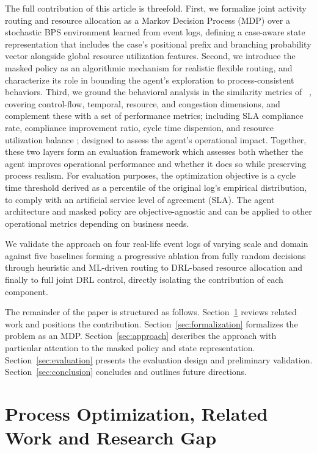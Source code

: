 \documentclass[runningheads]{llncs}
\begin{document}
The full contribution of this article is threefold. First, we formalize joint activity routing and resource allocation as a Markov Decision Process (MDP) over a stochastic BPS environment learned from event logs, defining a case-aware state representation that includes the case's positional prefix and branching probability vector alongside global resource utilization features. Second, we introduce the masked policy as an algorithmic mechanism for realistic flexible routing, and characterize its role in bounding the agent's exploration to process-consistent behaviors. Third, we ground the behavioral analysis in the similarity metrics of \citeauthor{framework_for_measuring_the_quality_of_business_process_simulation_models}~\cite{framework_for_measuring_the_quality_of_business_process_simulation_models}, covering control-flow, temporal, resource, and congestion dimensions, and complement these with a set of performance metrics; including SLA compliance rate, compliance improvement ratio, cycle time dispersion, and resource utilization balance ; designed to assess the agent's operational impact. Together, these two layers form an evaluation framework which assesses both whether the agent improves operational performance and whether it does so while preserving process realism. For evaluation purposes, the optimization objective is a cycle time threshold derived as a percentile of the original log's empirical distribution, to comply with an artificial service level of agreement (SLA). The agent architecture and masked policy are objective-agnostic and can be applied to other operational metrics depending on business needs.

We validate the approach on four real-life event logs of varying scale and domain against five baselines forming a progressive ablation from fully random decisions through heuristic and ML-driven routing to DRL-based resource allocation and finally to full joint DRL control, directly isolating the contribution of each component.

The remainder of the paper is structured as follows. Section~\ref{sec:related_work} reviews related work and positions the contribution. Section~\ref{sec:formalization} formalizes the problem as an MDP. Section~\ref{sec:approach} describes the approach with particular attention to the masked policy and state representation. Section~\ref{sec:evaluation} presents the evaluation design and preliminary validation. Section~\ref{sec:conclusion} concludes and outlines future directions.

\section{Process Optimization, Related Work and Research Gap}
\label{sec:related_work}
\end{document}
